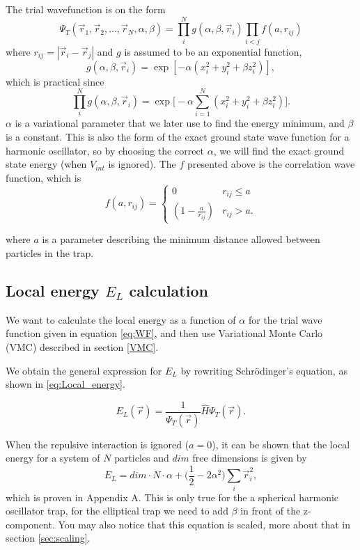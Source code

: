 \documentclass[norsk,a4paper,12pt]{article}
\begin{document}
The trial wavefunction is on the form 
\begin{equation}
\Psi_T(\vec{r}_1, \vec{r}_2, ..., \vec{r}_N, \alpha, \beta)=\prod_i^Ng(\alpha, \beta, \vec{r}_i)\prod_{i<j}f(a,r_{ij})
\label{eq:WF}
\end{equation}
where $r_{ij}=|\vec{r}_i-\vec{r}_j|$ and $g$ is assumed to be an exponential function,
\begin{equation}
g(\alpha, \beta, \vec{r}_i)=\exp[-\alpha(x_i^2+y_i^2+\beta z_i^2)],
\end{equation}
which is practical since
\begin{equation}
\prod_i^Ng(\alpha, \beta, \vec{r}_i)=\exp\Big[-\alpha\sum_{i=1}^N(x_i^2+y_i^2+\beta z_i^2)\Big].
\end{equation}
$\alpha$ is a variational parameter that we later use to find the energy minimum, and $\beta$ is a constant. This is also the form of the exact ground state wave function for a harmonic oscillator, so by choosing the correct $\alpha$, we will find the exact ground state energy (when $V_{int}$ is ignored). The $f$ presented above is the correlation wave function, which is 
\begin{equation}
\label{eq:WF_interaction_part}
f(a,r_{ij})=
\begin{cases} 
   0 & r_{ij} \leq a \\
   \left(1-\frac{a}{r_{ij}}\right) & r_{ij} > a.
\end{cases}
\end{equation}

where $a$ is a parameter describing the minimum distance allowed between particles in the trap.

\subsection{Local energy $E_L$ calculation}

We want to calculate the local energy as a function of $\alpha$ for the trial wave function given in equation \ref{eq:WF}, and then use Variational Monte Carlo (VMC) described in section \ref{VMC}. 

We obtain the general  expression for $E_L$ by rewriting Schr\"{o}dinger's equation, as shown in \ref{eq:Local_energy}.

\begin{equation}
E_L(\vec{r})=\frac{1}{\Psi_T(\vec{r})}\hat{H}\Psi_T(\vec{r}).
\label{eq:Local_energy}
\end{equation}

When the repulsive interaction is ignored ($a=0$), it can be shown that the local energy for a system of $N$ particles and $dim$ free dimensions is given by
\begin{equation}
E_L=dim\cdot N\cdot \alpha + \Big(\frac{1}{2}-2\alpha^2\Big)\sum_i\vec{r}_i^2,
\end{equation}
which is proven in Appendix A. This is only true for the a spherical harmonic oscillator trap, for the elliptical trap we need to add $\beta$ in front of the z-component. You may also notice that this equation is scaled, more about that in section \ref{sec:scaling}.
\end{document}
